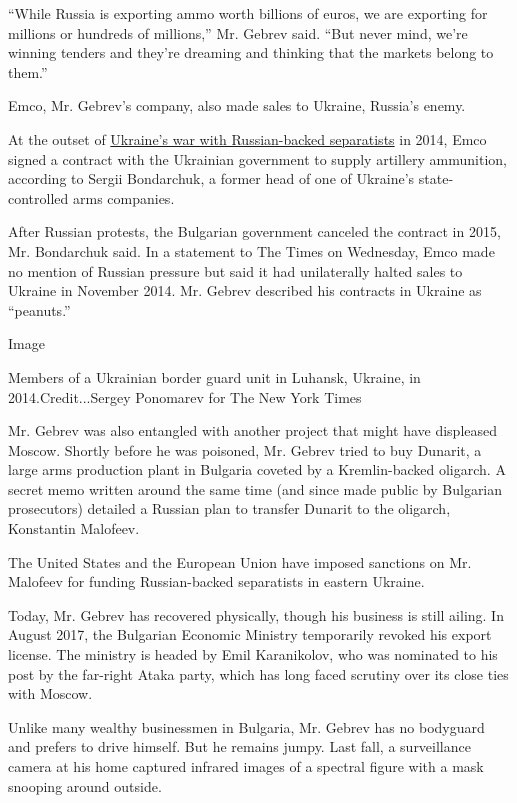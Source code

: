 ``While Russia is exporting ammo worth billions of euros, we are
exporting for millions or hundreds of millions,'' Mr. Gebrev said. ``But
never mind, we're winning tenders and they're dreaming and thinking that
the markets belong to them.''

Emco, Mr. Gebrev's company, also made sales to Ukraine, Russia's enemy.

At the outset of
\href{https://www.nytimes.com/2014/03/19/world/europe/ukraine.html}{Ukraine's
war with Russian-backed separatists} in 2014, Emco signed a contract
with the Ukrainian government to supply artillery ammunition, according
to Sergii Bondarchuk, a former head of one of Ukraine's state-controlled
arms companies.

After Russian protests, the Bulgarian government canceled the contract
in 2015, Mr. Bondarchuk said. In a statement to The Times on Wednesday,
Emco made no mention of Russian pressure but said it had unilaterally
halted sales to Ukraine in November 2014. Mr. Gebrev described his
contracts in Ukraine as ``peanuts.''

Image

Members of a Ukrainian border guard unit in Luhansk, Ukraine, in
2014.Credit...Sergey Ponomarev for The New York Times

Mr. Gebrev was also entangled with another project that might have
displeased Moscow. Shortly before he was poisoned, Mr. Gebrev tried to
buy Dunarit, a large arms production plant in Bulgaria coveted by a
Kremlin-backed oligarch. A secret memo written around the same time (and
since made public by Bulgarian prosecutors) detailed a Russian plan to
transfer Dunarit to the oligarch, Konstantin Malofeev.

The United States and the European Union have imposed sanctions on Mr.
Malofeev for funding Russian-backed separatists in eastern Ukraine.

Today, Mr. Gebrev has recovered physically, though his business is still
ailing. In August 2017, the Bulgarian Economic Ministry temporarily
revoked his export license. The ministry is headed by Emil Karanikolov,
who was nominated to his post by the far-right Ataka party, which has
long faced scrutiny over its close ties with Moscow.

Unlike many wealthy businessmen in Bulgaria, Mr. Gebrev has no bodyguard
and prefers to drive himself. But he remains jumpy. Last fall, a
surveillance camera at his home captured infrared images of a spectral
figure with a mask snooping around outside.

